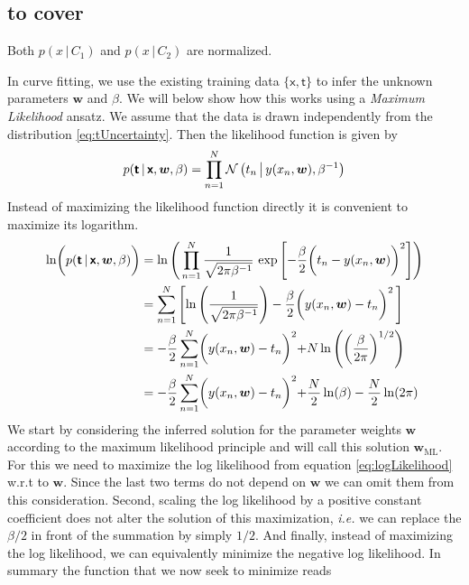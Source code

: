 \documentclass[11pt, DINA4, fleqn]{amsart}
\begin{document}
\subsection{to cover}
Both $p(x \, | \, C_1)$ and $p(x \, | \, C_2)$ are normalized.
\newpage









In curve fitting, we use the existing training data $\{\boldsymbol{\mathsf{x}}, \boldsymbol{\mathsf{t}}\}$ to infer the unknown parameters $\bm{w}$ and $\beta$.
We will below show how this works using a \emph{Maximum Likelihood} ansatz.
We assume that the data is drawn independently from the distribution \eqref{eq:tUncertainty}. Then the likelihood function is given by
\begin{align}
p(\boldsymbol{\mathsf{t}} \, | \, \boldsymbol{\mathsf{x}}, \bm{w}, \beta) = 
\prod\displaylimits_{n = 1}^{N}
\mathcal{N}\left(
t_n \, \bigl| \, y(x_n,\bm{w}), \beta^{-1}\right)
\label{eq:likelihoodFunc}
\end{align}
Instead of maximizing the likelihood function directly it is convenient to maximize its logarithm.
\begin{align}
\ln\biggl(p(\boldsymbol{\mathsf{t}} \, | \, \boldsymbol{\mathsf{x}}, \bm{w}, \beta)\biggl) &= \ln\left(\,
\prod\displaylimits_{n=1}^{N} \dfrac{1}{\sqrt{2\pi \beta^{-1}}} \, \exp\left[
-\dfrac{\beta}{2}\biggl(t_n - y(x_n,\bm{w})\biggl)^2
\right]
\right) \\
&=
\sum\displaylimits_{n=1}^{N}
\left[
\ln\left(\dfrac{1}{\sqrt{2\pi \beta^{-1}}}\right) -
\dfrac{\beta}{2}\biggl(y(x_n, \bm{w}) - t_n\biggl)^2 \,
\right] \\
&=
-\dfrac{\beta}{2}\sum\displaylimits_{n=1}^{N} \biggl(y(x_n, \bm{w}) - t_n\biggl)^2 +
N \ln\left(\left(\dfrac{\beta}{2\pi}\right)^{1/2}\right) \\
&= 
-\dfrac{\beta}{2}\sum\displaylimits_{n=1}^{N} \biggl(y(x_n, \bm{w}) - t_n\biggl)^2 +
\dfrac{N}{2}\ln(\beta)
- \dfrac{N}{2}\ln(2\pi)
\label{eq:logLikelihood}
\end{align}
We start by considering the inferred solution for the parameter weights $\bm{w}$ according to the maximum likelihood principle and will call this solution $\bm{w}_{\text{ML}}$. For this we need to maximize the log likelihood from equation \eqref{eq:logLikelihood} w.r.t to $\bm{w}$.
Since the last two terms do not depend on $\bm{w}$ we can omit them from this consideration. Second, scaling the log likelihood by a positive constant coefficient does not alter the solution of this maximization, \textit{i.e.} we can replace the $\beta/ 2$ in front of the summation by simply $1/2$. And finally, instead of maximizing the log likelihood, we can equivalently minimize the negative log likelihood. In summary the function that we now seek to minimize reads
\end{document}
